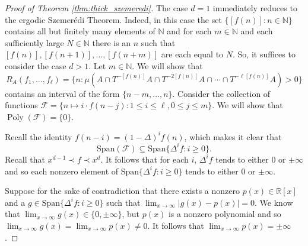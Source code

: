 \documentclass[12pt]{article}
\theoremstyle{plain} %
\theoremstyle{definition} %
\theoremstyle{plain}
\theoremstyle{plain}
\numberwithin{equation}{section}
\newcommand{\N}{\mathbb{N}}
\newcommand{\R}{\mathbb{R}}
\renewcommand{\leq}{\leqslant}
\renewcommand{\geq}{\geqslant}
\renewcommand{\subset}{\subseteq}
\newcommand{\1}{\mathbbm{1}}
\newcommand{\Poly}{\operatorname{Poly}}
\newcommand{\oo}{\infty}
\newcommand{\round}[1]{[ #1 ]}
\begin{document}
\begin{proof}[Proof of Theorem \ref{thm:thick_szemeredi}]
   The case $d=1$ immediately reduces to the ergodic Szemer\'edi Theorem. Indeed, in this case the set $\{\round{f(n)}:n\in \N\}$ contains all but finitely many elements of $\N$ and for each $m\in \N$ and each sufficiently large $N\in\N$ there is an $n$ such that $\round{f(n)},\round{f(n+1)},\dots, \round{f(n+m)}$ are each equal to $N$. So, it suffices to consider the case $d>1$. Let $m\in \N$. We will show that 
   \begin{equation}\label{eq:thick_sz_proof}
        R_A(f_1,\dots, f_{\ell})=\{n:\mu(A\cap T^{-[ f(n)]}A\cap T^{-2[ f(n)]}A\cap \cdots\cap T^{-\ell[ f(n)]}A )>0\}
   \end{equation}
   contains an interval of the form $\{n-m,\dots, n\}$. Consider the collection of functions $\mathscr{F} = \{n\mapsto i\cdot f(n-j): 1\leq i\leq \ell, 0\leq j\leq m\}$. We will show that $\Poly(\mathscr{F}) = \{0\}$. 
   
   
   Recall the identity $f(n-i) = (1-\Delta)^if(n)$, which makes it clear that \begin{equation}
       \text{Span}(\mathscr{F}) \subset  \text{Span}\{\Delta^if:i\geq 0\}.
   \end{equation} 
   Recall that $x^{d-1}\prec f\prec x^d$. It follows that for each $i$, $\Delta^if$ tends to either $0$ or $\pm\oo$ and so each nonzero element of $\text{Span}\{\Delta^if:i\geq 0\}$ tends to either $0$ or $\pm \oo$. 
   
   Suppose for the sake of contradiction that there exists a nonzero $p(x)\in \R[x]$ and a $g\in \text{Span}\{\Delta^if:i\geq 0\}$ such that $\lim_{x\to\oo}|g(x)-p(x)| = 0$. We know that $\lim_{x\to\infty}g(x) \in \{0,\pm\oo\}$, but $p(x)$ is a nonzero polynomial and so $\lim_{x\to\infty}g(x)=\lim_{x\to\infty}p(x)\neq 0$. It follows that $\lim_{x\to\oo}p(x)=\pm\oo$.
   

\end{proof}
\end{document}

